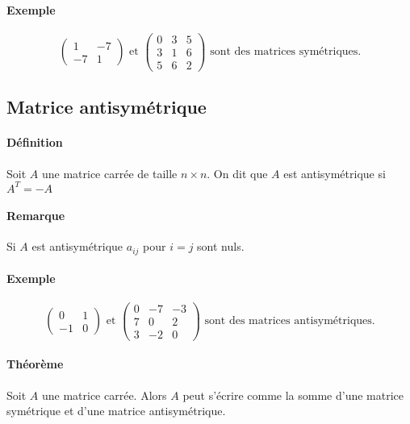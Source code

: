 \paragraph{Exemple}$$\begin{pmatrix}1&-7\\-7&1\end{pmatrix} \text{ et }\begin{pmatrix}0&3&5\\3&1&6\\5&6&2\end{pmatrix}\text{ sont des matrices symétriques.}$$

%
\subsection{Matrice antisymétrique}
%
\paragraph{Définition} Soit $A$ une matrice carrée de taille $n\times n$. On dit que $A$ est antisymétrique si $A^{T} = -A$
\paragraph{Remarque} Si $A$ est antisymétrique $a_{ij}$ pour $i=j$ sont nuls.

\paragraph{Exemple}$$\begin{pmatrix}0&1\\-1&0\end{pmatrix} \text{ et }\begin{pmatrix}0&-7&-3\\7&0&2\\3&-2&0\end{pmatrix}\text{ sont des matrices antisymétriques.}$$

\paragraph{Théorème} Soit $A$ une matrice carrée. Alors $A$ peut s'écrire comme la somme d'une matrice symétrique et d'une matrice antisymétrique.

